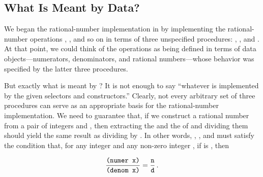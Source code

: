 \subsection{What Is Meant by Data?}
\label{Section 2.1.3}

We began the rational-number implementation in  by
implementing the rational-number operations , , and
so on in terms of three unspecified procedures: , ,
and .  At that point, we could think of the operations as being
defined in terms of data objects---numerators, denominators, and rational
numbers---whose behavior was specified by the latter three procedures.

But exactly what is meant by ?  It is not enough to say
``whatever is implemented by the given selectors and constructors.''  Clearly,
not every arbitrary set of three procedures can serve as an appropriate basis
for the rational-number implementation.  We need to guarantee that, if we
construct a rational number  from a pair of integers  and
, then extracting the  and the  of  and
dividing them should yield the same result as dividing  by .
In other words, , , and  must satisfy
the condition that, for any integer  and any non-zero integer ,
if  is , then
\begin{comment}

\begin{example}
(numer x)    n
--------- = ---
(denom x)    d
\end{example}

\end{comment}

$$ {\hbox{\tt(numer x)} \over \hbox{\tt(denom x)}} = {{\tt n} \over {\tt d}}\,.  $$


